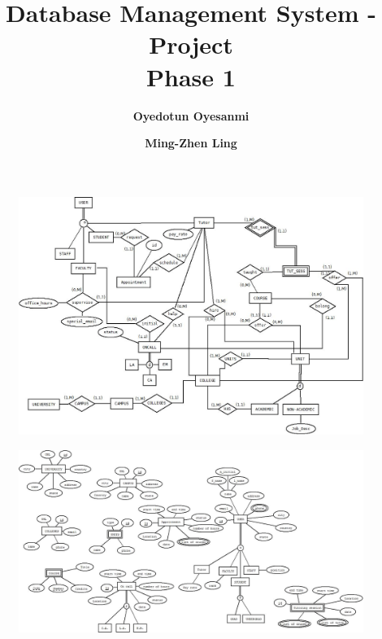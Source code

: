 \documentclass[titlepage]{article}
\author{
	\textbf{Oyedotun Oyesanmi } 
	\and 
	\textbf{Ming-Zhen Ling}}
\title{Database Management System - Project\\Phase 1}
\begin{document}
\maketitle
\pagebreak
\begin{figure}[ht]
\centering
\includegraphics[trim=3cm 0cm 0cm 3cm, clip=false, totalheight=0.5\textheight, angle=90]{Relationship-Phase1.jpeg}
\clearpage
\end{figure}

\begin{figure}[ht]	
\includegraphics[trim=0cm 0cm 0cm -1cm, clip=false, totalheight=0.56\textheight, angle=90]{Entity-Phase1.jpeg} 
\end{figure}
\clearpage
\end{document}
